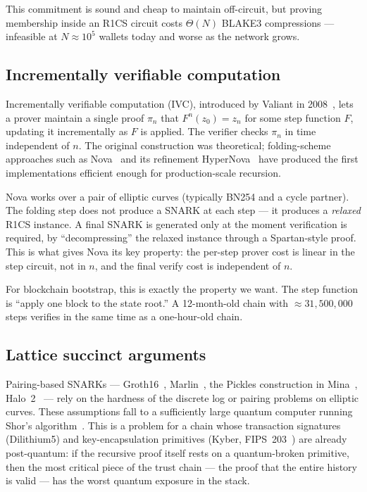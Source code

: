 \documentclass[11pt,a4paper]{article}
\begin{document}
This commitment is sound and cheap to maintain off-circuit, but proving membership
inside an R1CS circuit costs $\Theta(N)$ BLAKE3 compressions --- infeasible at
$N \approx 10^5$ wallets today and worse as the network grows.

\subsection{Incrementally verifiable computation}

Incrementally verifiable computation (IVC), introduced by Valiant in
2008~\cite{Valiant2008}, lets a prover maintain a single proof $\pi_n$ that
$F^n(z_0) = z_n$ for some step function $F$, updating it incrementally as
$F$ is applied. The verifier checks $\pi_n$ in time independent of $n$.
The original construction was theoretical; folding-scheme approaches such as
Nova~\cite{KothapalliSettyTzialla2021} and its refinement
HyperNova~\cite{KothapalliSetty2023HyperNova} have produced the first
implementations efficient enough for production-scale recursion.

Nova works over a pair of elliptic curves (typically BN254 and a cycle partner).
The folding step does not produce a SNARK at each step --- it produces a
\emph{relaxed} R1CS instance. A final SNARK is generated only at the moment
verification is required, by ``decompressing'' the relaxed instance through
a Spartan-style proof. This is what gives Nova its key property: the per-step
prover cost is linear in the step circuit, not in $n$, and the final verify cost
is independent of $n$.

For blockchain bootstrap, this is exactly the property we want.
The step function is ``apply one block to the state root.''
A 12-month-old chain with $\approx 31{,}500{,}000$ steps verifies in the same
time as a one-hour-old chain.

\subsection{Lattice succinct arguments}

Pairing-based SNARKs --- Groth16~\cite{Groth16},
Marlin~\cite{Marlin}, the Pickles construction in Mina~\cite{MinaPickles},
Halo~2~\cite{Halo2} --- rely on the hardness of the discrete log
or pairing problems on elliptic curves. These assumptions fall to a
sufficiently large quantum computer running Shor's algorithm~\cite{Shor1994}.
This is a problem for a chain whose transaction signatures
(Dilithium5) and key-encapsulation primitives (Kyber, FIPS~203~\cite{FIPS203}) are
already post-quantum: if the recursive proof itself rests on a quantum-broken
primitive, then the most critical piece of the trust chain --- the proof
that the entire history is valid --- has the worst quantum exposure in the
stack.
\end{document}
